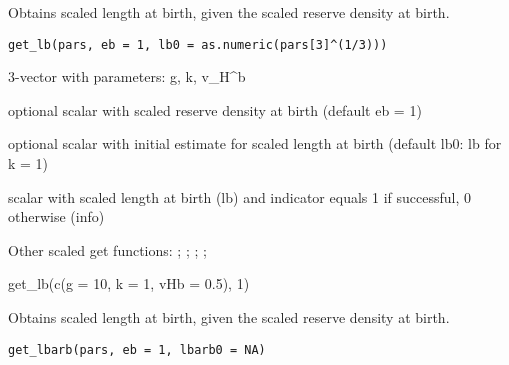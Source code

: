 \documentclass[a4paper]{book}
\begin{document}
%
\begin{Description}\relax
Obtains scaled length at birth, given the scaled reserve density at birth.
\end{Description}
%
\begin{Usage}
\begin{verbatim}
get_lb(pars, eb = 1, lb0 = as.numeric(pars[3]^(1/3)))
\end{verbatim}
\end{Usage}
%
\begin{Arguments}
\begin{ldescription}
\item[\code{pars}] 3-vector with parameters: g, k, v\_H\textasciicircum{}b

\item[\code{eb}] optional scalar with scaled reserve density at birth (default eb = 1)

\item[\code{lbarb0}] optional scalar with initial estimate for scaled length at birth (default lb0: lb for k = 1)
\end{ldescription}
\end{Arguments}
%
\begin{Value}
scalar with scaled length at birth (lb) and indicator equals 1 if successful, 0 otherwise (info)
\end{Value}
%
\begin{SeeAlso}\relax
Other scaled get functions: ;
; ;
;
\end{SeeAlso}
%
\begin{Examples}
\begin{ExampleCode}
get_lb(c(g = 10, k = 1, vHb = 0.5), 1)
\end{ExampleCode}
\end{Examples}
%
\begin{Description}\relax
Obtains scaled length at birth, given the scaled reserve density at birth.
\end{Description}
%
\begin{Usage}
\begin{verbatim}
get_lbarb(pars, eb = 1, lbarb0 = NA)
\end{verbatim}
\end{Usage}
\end{document}
